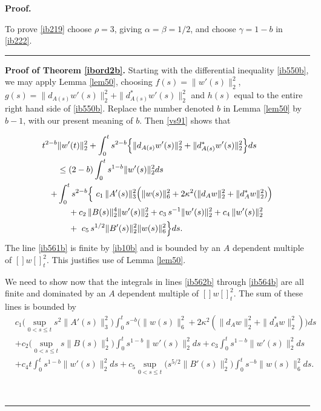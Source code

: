 \documentclass[12pt]{article}
\newenvironment{proof}[1][Proof]{\textbf{#1.} }{\ \rule{0.5em}{0.5em}}
\def \nn{[]}
\def \eref{\eqref}
\numberwithin{equation}{section}
\begin{document}
\begin{proof}
             
               To prove \eref{ib219} choose $\rho =3$, giving $\alpha = \beta =  1/2$, and 
  choose $\gamma =1-b $ in \eref{ib222}.
\end{proof}

  
      
\bigskip
\noindent
             \begin{proof}[Proof of Theorem \ref{ibord2b}] 
Starting with the differential inequality   \eref{ib550b},   we may apply
Lemma \ref{lem50}, choosing  
$f(s) = \|w'(s)\|_2^2$,  $g(s) =  \|d_{A(s)} w'(s) \|_2^2  + \|d_{A(s)}^* w'(s) \|_2^2 $
 and  $h(s)$ equal  to the entire right  hand side of  \eref{ib550b}. 
Replace  the number denoted $b$ in  Lemma \ref{lem50}  by $b-1$, with our
 present meaning of $b$.  
   Then \eref{vs91} shows that 
 
\begin{align}
t^{2-b}& \| w'(t)\|_2^2 
+\int_0^t s^{2-b} \Big\{ \|d_{A(s)} w'(s) \|_2^2  + \|d_{A(s)}^* w'(s) \|_2^2  \Big\}ds     \notag\\
&\le (2-b) \int_0^t s^{1-b} \|w'(s)\|_2^2ds      \label{ib561b}\\
+&\int_0^t  s^{2-b} \Big\{\ c_1\, \|A'(s)\|_3^2 \Big(\|w(s)\|_6^2 
                               + 2\kappa^2  ( \|d_Aw\|_2^2 + \|d_A^* w\|_2^2 ) \Big)       \label{ib562b}\\
&\ \ \ \ + c_2\, \| B(s)\|_2^4 \|w'(s)\|_2^2 + c_3\, s^{-1} \|w'(s)\|_2^2  
                                 + c_4\, \|w'(s)\|_2^2                                                                \label{ib563b}\\
 &\ \ \  \ +\ c_5\,  s^{1/2} \|B'(s)\|_2^2 \| w(s)\|_6^2  \Big\} ds   .                 \label{ib564b}
 \end{align}
The line \eref{ib561b} is finite by \eref{ib10b} and is bounded by an $A$ 
dependent multiple of $\nn w\nn_t^2$.  This justifies use of Lemma \ref{lem50}.  

 We need to show now that the integrals in lines \eref{ib562b} through \eref{ib564b}
  are all finite and dominated by an $A$ dependent multiple of $\nn w\nn_t^2$.  
 The sum of these lines is  bounded by
 \begin{align}
 &c_1 \Big(\sup_{0 < s \le t} s^2 \|A'(s)\|_3^2\Big)\int_0^t  s^{-b}\Big(\|w(s)\|_6^2 
                               + 2\kappa^2  ( \|d_Aw\|_2^2 + \|d_A^* w\|_2^2 ) \Big)  ds \label{ib565.1}\\
  & +c_2 \Big(\sup_{0 < s \le t} s \|B(s)\|_2^4\Big)\int_0^t s^{1-b}  \|w'(s)\|_2^2 ds
  + c_3 \int_0^t s^{1-b} \| w'(s)\|_2^2 ds  \label{ib565.2}\\
  &+c_4 t\int_0^t s^{1-b} \| w'(s)\|_2^2 ds
  + c_5 \sup_{0< s \le t}\Big( s^{5/2} \| B'(s)\|_2^2\Big)
                                           \int_0^t s^{-b} \| w(s)\|_6^ 2 ds. \label{ib565.3}
 \end{align}


\end{proof}
\end{document}
